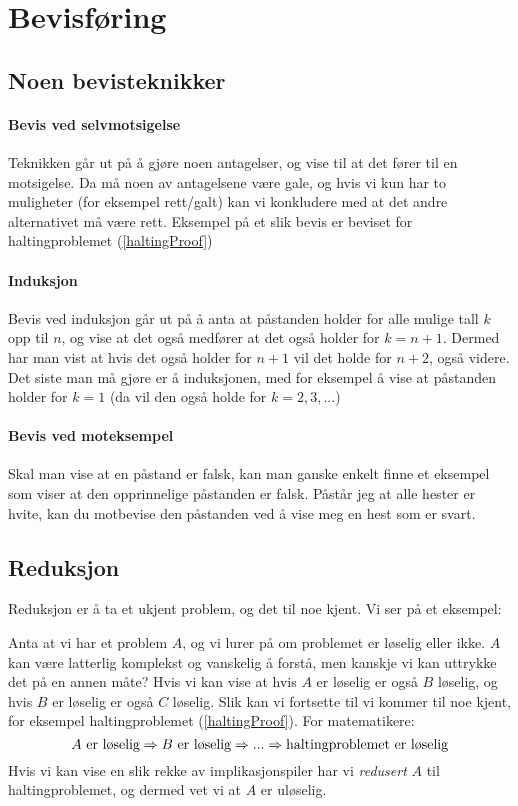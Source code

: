 \section{Bevisføring}
\subsection{Noen bevisteknikker}
\paragraph{Bevis ved selvmotsigelse}
Teknikken går ut på å gjøre noen antagelser, og vise til at det fører til en motsigelse. Da må noen av antagelsene være gale, og hvis vi kun har to muligheter (for eksempel rett/galt) kan vi konkludere med at det andre alternativet må være rett. Eksempel på et slik bevis er beviset for haltingproblemet (\ref{haltingProof})

\paragraph{Induksjon}
Bevis ved induksjon går ut på å anta at påstanden holder for alle mulige tall $ k $ opp til $ n $, og vise at det også medfører at det også holder for $ k = n+1 $. Dermed har man vist at hvis det også holder for $ n+1 $ vil det holde for $ n+2 $, også videre. Det siste man må gjøre er å  induksjonen, med for eksempel å vise at påstanden holder for $ k=1 $ (da vil den også holde for $ k=2, 3, ... $)

\paragraph{Bevis ved moteksempel}
Skal man vise at en påstand er falsk, kan man ganske enkelt finne et eksempel som viser at den opprinnelige påstanden er falsk. Påstår jeg at alle hester er hvite, kan du motbevise den påstanden ved å vise meg en hest som er svart.



\subsection{Reduksjon}
Reduksjon er å ta et ukjent problem, og  det til noe kjent. Vi ser på et eksempel:

Anta at vi har et problem $ A $, og vi lurer på om problemet er løselig eller ikke. $ A $ kan være latterlig komplekst og vanskelig å forstå, men kanskje vi kan uttrykke det på en annen måte? Hvis vi kan vise at hvis $ A $ er løselig er også $ B $ løselig, og hvis $ B $ er løselig er også $ C $ løselig. Slik kan vi fortsette til vi kommer til noe kjent, for eksempel haltingproblemet (\ref{haltingProof}). For matematikere:
\[ \text{$ A $ er løselig} \Rightarrow \text{$ B $ er løselig} \Rightarrow ... \Rightarrow \text{haltingproblemet er løselig} \]
Hvis vi kan vise en slik rekke av implikasjonspiler har vi \emph{redusert} $ A $ til haltingproblemet, og dermed vet vi at $ A $ er uløselig.

